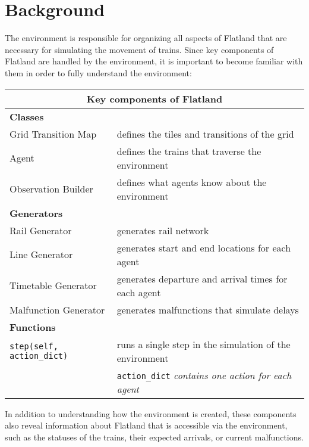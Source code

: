 \section{Background}\label{sec:background}

The environment is responsible for organizing all aspects of Flatland that are necessary for simulating the movement of trains.  
Since key components of Flatland are handled by the environment, it is important to become familiar with them in order to fully understand the environment: \\

\begin{table}[H]
\centering
	{\footnotesize
  	\begin{tabular}{@{\hspace*{1em}}ll@{}}
    	\toprule \toprule
    	\multicolumn{2}{c}{Key components of Flatland} \\

    	\midrule

    	\textbf{Classes} \\
    	\tabitem Grid Transition Map & defines the tiles and transitions of the grid \\
    	\tabitem Agent & defines the trains that traverse the environment \\
    	\tabitem Observation Builder & defines what agents know about the environment \\[.75\normalbaselineskip]
    
	\textbf{Generators} \\
    	\tabitem Rail Generator & generates rail network \\
	\tabitem Line Generator & generates start and end locations for each agent \\
    	\tabitem Timetable Generator & generates departure and arrival times for each agent \\
	\tabitem Malfunction Generator & generates malfunctions that simulate delays \\[.75\normalbaselineskip]
    
	\textbf{Functions} \\
	\tabitem \texttt{step(self, action\_dict)} & runs a single step in the simulation of the environment \\
	 & \texttt{action\_dict} \textit{contains one action for each agent} \\

	\bottomrule
  	\end{tabular}
	}
\end{table}

\noindent In addition to understanding how the environment is created, these components also reveal information about Flatland that is accessible via the environment, such as the statuses of the trains, their expected arrivals, or current malfunctions.
